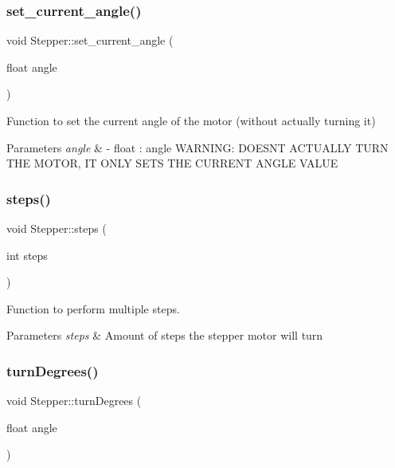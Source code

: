 \subsubsection{\texorpdfstring{set\+\_\+current\+\_\+angle()}{set\_current\_angle()}}
{\footnotesize\ttfamily void Stepper\+::set\+\_\+current\+\_\+angle (\begin{DoxyParamCaption}\item[{float}]{angle }\end{DoxyParamCaption})}



Function to set the current angle of the motor (without actually turning it) 


\begin{DoxyParams}{Parameters}
{\em angle} & -\/ float \+: angle W\+A\+R\+N\+I\+NG\+: D\+O\+E\+SN\textquotesingle{}T A\+C\+T\+U\+A\+L\+LY T\+U\+RN T\+HE M\+O\+T\+OR, IT O\+N\+LY S\+E\+TS T\+HE C\+U\+R\+R\+E\+NT A\+N\+G\+LE V\+A\+L\+UE \\
\hline
\end{DoxyParams}
\mbox{\label{class_stepper_a2c8e1dc27b90db4a6f4dbb3f2bce57ae}} 
\subsubsection{\texorpdfstring{steps()}{steps()}}
{\footnotesize\ttfamily void Stepper\+::steps (\begin{DoxyParamCaption}\item[{int}]{steps }\end{DoxyParamCaption})}



Function to perform multiple steps. 


\begin{DoxyParams}{Parameters}
{\em steps} & Amount of steps the stepper motor will turn \\
\hline
\end{DoxyParams}
\mbox{\label{class_stepper_a3fd642788644f9f658107644fee29aca}} 
\subsubsection{\texorpdfstring{turn\+Degrees()}{turnDegrees()}}
{\footnotesize\ttfamily void Stepper\+::turn\+Degrees (\begin{DoxyParamCaption}\item[{float}]{angle }\end{DoxyParamCaption})}



